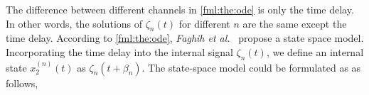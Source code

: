 \documentclass[10pt,conference]{ieeeconf}
\begin{document}
The difference between different channels in \eqref{fml:the:ode} is only the time delay. In other words, the solutions of $\zeta_n(t)$ for different $n$ are the same except the time delay. According to \eqref{fml:the:ode}, \textit{Faghih et al.}~\cite{faghih2015characterization} propose a state space model. Incorporating the time delay into the internal signal $\zeta_n(t)$, we define an internal state $x^{(n)}_2 (t)$ as $\zeta_n(t + \beta_n)$. The state-space model could be formulated as as follows,
%
%
\end{document}
